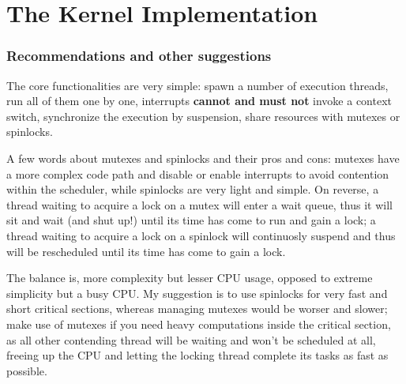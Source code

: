 \documentclass[11pt,b5paper]{scrbook}
\begin{document}
\chapter{The Kernel Implementation}
\newpage
\subsection{Recommendations and other suggestions}
The core functionalities are very simple: spawn a number of execution threads, run all
of them one by one, interrupts \textbf{cannot and must not} invoke a context switch,
synchronize the execution by suspension, share resources with mutexes or spinlocks.

A few words about mutexes and spinlocks and their pros and cons: mutexes have a more complex
code path and disable or enable interrupts to avoid contention within the scheduler, while
spinlocks are very light and simple.
On reverse, a thread waiting to acquire a lock on a mutex will enter a wait queue, thus it will
sit and wait (and shut up!) until its time has come to run and gain a lock; a thread waiting to
acquire a lock on a spinlock will continuosly suspend and thus will be rescheduled until its
time has come to gain a lock.

The balance is, more complexity but lesser CPU usage, opposed to extreme simplicity but a busy CPU.
My suggestion is to use spinlocks for very fast and short critical sections, whereas managing mutexes
would be worser and slower; make use of mutexes if you need heavy computations inside the critical 
section, as all other contending thread will be waiting and won't be scheduled at all, freeing up the 
CPU and letting the locking thread complete its tasks as fast as possible.
\end{document}
